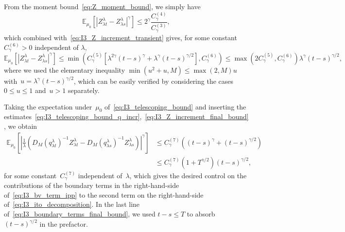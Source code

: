 \documentclass[10pt]{article}
\newcommand{\E}{\mathbb{E}}
\newcommand{\1}{\mathbbm 1}
\begin{document}
From the moment bound~\eqref{eq:Z_moment_bound}, we simply have
\begin{equation}
    \E_{\mu_0}\left[|Z_{\lambda t}^\lambda -Z_{\lambda s}^\lambda|^\gamma\right] \leq 2^{\gamma}\frac{C_\gamma^{(4)}}{C_\gamma^{(3)}},
\end{equation}
which combined with~\eqref{eq:I3_Z_increment_transient} gives, for some constant~$C^{(6)}_\gamma>0$ independent of $\lambda$,
\begin{equation}
    \label{eq:I3_Z_increment_final_bound}
    \E_{\mu_0}\left[|Z_{\lambda t}^\lambda -Z_{\lambda s}^\lambda|^\gamma\right] \leq \min\left(C_\gamma^{(5)}\left[\lambda^{2\gamma}(t-s)^\gamma+\lambda^\gamma(t-s)^{\gamma/2}\right],C^{(6)}_\gamma\right)\leq \max(2C_\gamma^{(5)},C^{(6)}_\gamma)\lambda^{\gamma}(t-s)^{\gamma/2},
\end{equation}
where we used the elementary inequality $\min(u^2+u,M)\leq \max(2,M)u$ with~$u=\lambda^\gamma(t-s)^{\gamma/2}$, which can be easily verified by considering the cases~$0\leq u\leq 1$ and~$u>1$ separately.

Taking the expectation under~$\mu_0$ of~\eqref{eq:I3_telescoping_bound} and inserting the estimates~\eqref{eq:I3_telescoping_bound_q_incr},~\eqref{eq:I3_Z_increment_final_bound}, we obtain
\begin{equation}
    \label{eq:I3_boundary_terms_final_bound}
    \begin{aligned}
        \E_{\mu_0}\left[\left|\frac1\lambda\left(D_M(q_{\lambda t}^\lambda)^{-1}Z_{\lambda t}^\lambda - D_M(q_{\lambda s}^\lambda)^{-1}Z_{\lambda s}^\lambda\right)\right|^\gamma\right]&\leq C^{(7)}_\gamma\left((t-s)^\gamma+(t-s)^{\gamma/2}\right)\\
        &\leq C^{(7)}_\gamma(1+T^{\gamma/2})(t-s)^{\gamma/2},
    \end{aligned}
\end{equation}
for some constant~$C^{(7)}_\gamma$ independent of~$\lambda$, which gives the desired control on the contributions of the boundary terms in the right-hand-side of~\eqref{eq:I3_bv_term_ipp} to the second term on the right-hand-side of~\eqref{eq:I3_ito_decomposition}. In the last line of~\eqref{eq:I3_boundary_terms_final_bound}, we used $t-s\leq T$ to absorb~$(t-s)^{\gamma/2}$ in the prefactor.
\end{document}
